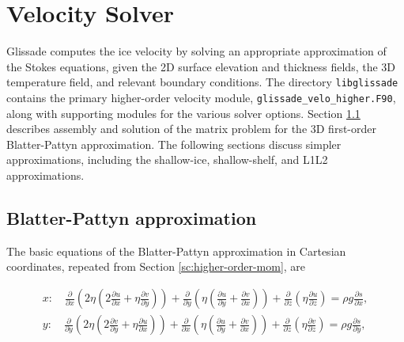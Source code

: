 
\section{Velocity Solver}
\label{sc:glissade-velocity}

Glissade computes the ice velocity by solving an appropriate
approximation of the Stokes equations, given the 2D surface elevation and thickness fields,
the 3D temperature field, and relevant boundary conditions.
The directory \texttt{libglissade} contains the primary higher-order velocity module,
\texttt{glissade\_velo\_higher.F90}, along with supporting modules for the various solver options.
Section \ref{sc:glissade-blatter-pattyn} describes assembly and solution of the matrix problem for the 
3D first-order Blatter-Pattyn approximation.  
The following sections discuss simpler approximations, including the shallow-ice, shallow-shelf,
and L1L2 approximations.

\subsection{Blatter-Pattyn approximation}
\label{sc:glissade-blatter-pattyn}

The basic equations of the Blatter-Pattyn approximation in Cartesian coordinates, repeated from 
Section \ref{sc:higher-order-mom}, are 

\begin{equation}
  \label{gliss.eq.stress_balance}
  \begin{split}
    x: \quad \frac{\partial }{\partial x}\left( 2 \eta \left(2\frac{\partial u}{\partial x} +  \eta \frac{\partial v}{\partial y} \right) \right) 
    + \frac{\partial }{\partial y}\left( \eta \left( \frac{\partial u}{\partial y} + \frac{\partial v}{\partial x} \right) \right) 
    +\frac{\partial }{\partial z}\left( \eta \frac{\partial u}{\partial z} \right) = \rho g\frac{\partial s}{\partial x}, \\
    y: \quad \frac{\partial }{\partial y}\left( 2 \eta \left( 2\frac{\partial v}{\partial y} + \eta \frac{\partial u}{\partial x} \right) \right) 
    + \frac{\partial }{\partial x}\left( \eta \left( \frac{\partial u}{\partial y} + \frac{\partial v}{\partial x} \right) \right) 
    +\frac{\partial }{\partial z}\left( \eta \frac{\partial v}{\partial z} \right) = \rho g\frac{\partial s}{\partial y},  \\
  \end{split}
\end{equation}

